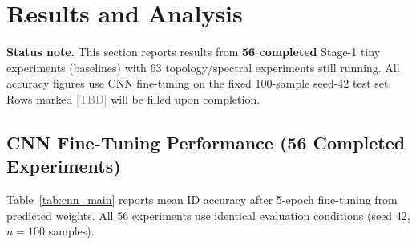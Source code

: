 \section{Results and Analysis}
\label{sec:results}

\noindent\textbf{Status note.} This section reports results from \textbf{56 completed} Stage-1 tiny experiments (baselines) with 63 topology/spectral experiments still running. All accuracy figures use CNN fine-tuning on the fixed 100-sample seed-42 test set. Rows marked \textcolor{gray}{[TBD]} will be filled upon completion.

\subsection{CNN Fine-Tuning Performance (56 Completed Experiments)}
\label{sec:res_cnn}

Table~\ref{tab:cnn_main} reports mean ID accuracy after 5-epoch fine-tuning from predicted weights. All 56 experiments use identical evaluation conditions (seed 42, $n{=}100$ samples).


